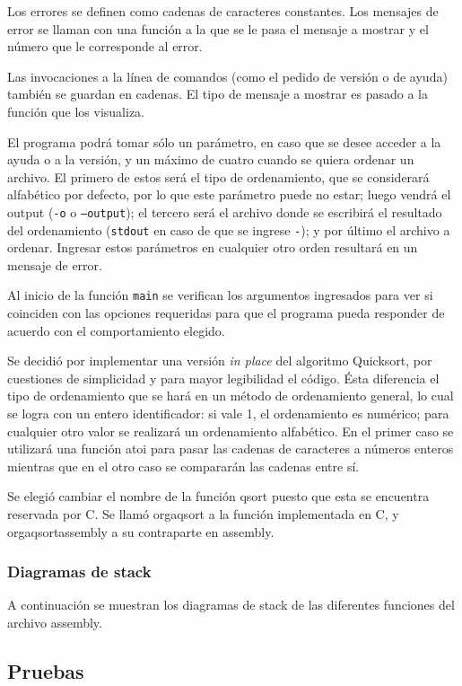 \documentclass[a4paper, 12pt]{article}
\begin{document}
		Los errores se definen como cadenas de caracteres constantes. Los mensajes de error se llaman con una función a la que se le pasa el mensaje a mostrar y el número que le corresponde al error.
		
		Las invocaciones a la línea de comandos (como el pedido de versión o de ayuda) también se guardan en cadenas. El tipo de mensaje a mostrar es pasado a la función que los visualiza.
		
		El programa podrá tomar sólo un parámetro, en caso que se desee acceder a la ayuda o a la versión, y un máximo de cuatro cuando se quiera ordenar un archivo. El primero de estos será el tipo de ordenamiento, que se considerará alfabético por defecto, por lo que este parámetro puede no estar; luego vendrá el output (\texttt{-o} o \texttt{--output}); el tercero será el archivo donde se escribirá el resultado del ordenamiento (\texttt{stdout} en caso de que se ingrese \texttt{-}); y por último el archivo a ordenar. Ingresar estos parámetros en cualquier otro orden resultará en un mensaje de error.
		
		Al inicio de la función \texttt{main} se verifican los argumentos ingresados para ver si coinciden con las opciones requeridas para que el programa pueda responder de acuerdo con el comportamiento elegido.
		
		Se decidió por implementar una versión \textit{in place} del algoritmo Quicksort, por cuestiones de simplicidad y para mayor legibilidad el código. Ésta diferencia el tipo de ordenamiento que se hará en un método de ordenamiento general, lo cual se logra con un entero identificador: si vale 1, el ordenamiento es numérico; para cualquier otro valor se realizará un ordenamiento alfabético. En el primer caso se utilizará una función atoi para pasar las cadenas de caracteres a números enteros mientras que en el otro caso se compararán las cadenas entre sí. 
		
		Se elegió cambiar el nombre de la función qsort puesto que esta se encuentra reservada por C. Se llamó orgaqsort a la función implementada en C, y orgaqsortassembly a su contraparte en assembly. 
	\subsubsection{Diagramas de stack}
		A continuación se muestran los diagramas de stack de las diferentes funciones del archivo assembly.
			
	\subsection{Pruebas}
	
\end{document}
